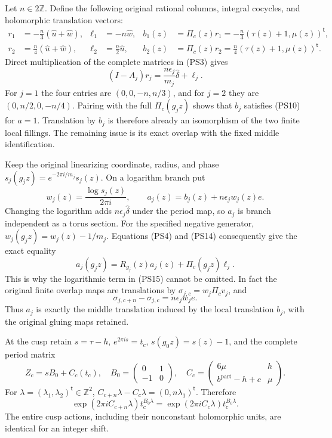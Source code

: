 Let $n\in2\mathbb Z$. Define the following original rational columns,
integral cocycles, and holomorphic translation vectors:
\[
\begin{aligned}
 r_1&=-\frac n3(\widehat u+\widehat w),&
 \ell_1&=-n\widehat w,&
 b_1(z)&=\Pi_c(z)r_1=-\frac n3(\tau(z)+1,\mu(z))^{\mathsf t},\\
 r_2&= \frac n4(\widehat u+\widehat w),&
 \ell_2&=\frac n2\widehat u,&
 b_2(z)&=\Pi_c(z)r_2=\frac n4(\tau(z)+1,\mu(z))^{\mathsf t}.
\end{aligned}
\tag{PS13}\label{wb:pshift:eq:local-corrections}
\]
Direct multiplication of the complete matrices in (PS3) gives
\[
 (I-A_j)r_j=\frac{n\epsilon_j}{m_j}\widehat\delta+\ell_j.
 \tag{PS14}\label{wb:pshift:eq:local-matrix-identity}
\]
For $j=1$ the four entries are $(0,0,-n,n/3)$, and for $j=2$
they are $(0,n/2,0,-n/4)$. Pairing with the full $\Pi_c(g_jz)$
shows that $b_j$ satisfies (PS10) for $a=1$.
Translation by $b_j$ is therefore already an isomorphism of the
two finite local fillings. The remaining issue is its exact overlap
with the fixed middle identification.

Keep the original linearizing coordinate, radius, and phase
$s_j(g_jz)=e^{-2\pi i/m_j}s_j(z)$. On a logarithm branch put
\[
 w_j(z)=\frac{\log s_j(z)}{2\pi i},\qquad
 a_j(z)=b_j(z)+n\epsilon_j w_j(z)e.
 \tag{PS15}\label{wb:pshift:eq:finite-middle-sections}
\]
Changing the logarithm adds $n\epsilon_j\widehat\delta$ under the
period map, so $a_j$ is branch independent as a torus section.
For the specified negative generator, $w_j(g_jz)=w_j(z)-1/m_j$.
Equations (PS4) and (PS14) consequently give the exact equality
\[
 a_j(g_jz)=R_{g_j}(z)a_j(z)+\Pi_c(g_jz)\ell_j.
 \tag{PS16}\label{wb:pshift:eq:local-affine-cocycle}
\]
This is why the logarithmic term in (PS15) cannot be omitted.
In fact the original finite overlap maps are translations by
$\sigma_{j,c}=w_j\Pi_c v_j$, and
\[
                  \sigma_{j,c+n}-\sigma_{j,c}
                     =n\epsilon_jw_je.
 \tag{PS17}\label{wb:pshift:eq:actual-overlap-difference}
\]
Thus $a_j$ is exactly the middle translation induced by the local
translation $b_j$, with the original gluing maps retained.

At the cusp retain $s=\tau-h$, $e^{2\pi is}=t_c$, $s(g_0z)=s(z)-1$,
and the complete period matrix
\[
 Z_c=sB_0+C_c(t_c),\quad
 B_0=\begin{pmatrix}0&1\\-1&0\end{pmatrix},\quad
 C_c=\begin{pmatrix}6\mu&h\\ b^{\mathrm{part}}-h+c&\mu\end{pmatrix}.
 \tag{PS18}\label{wb:pshift:eq:cusp-periods}
\]
For $\lambda=(\lambda_1,\lambda_2)^{\mathsf t}\in\mathbb Z^2$,
$C_{c+n}\lambda-C_c\lambda=(0,n\lambda_1)^{\mathsf t}$. Therefore
\[
 \exp(2\pi iC_{c+n}\lambda)t_c^{B_0\lambda}
       =\exp(2\pi iC_c\lambda)t_c^{B_0\lambda}.
 \tag{PS19}\label{wb:pshift:eq:cusp-actions-identical}
\]
The entire cusp actions, including their nonconstant holomorphic units,
are identical for an integer shift.

